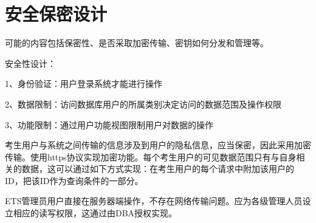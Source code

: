 \chapter{安全保密设计}
可能的内容包括保密性、是否采取加密传输、密钥如何分发和管理等。

安全性设计：

1、身份验证：用户登录系统才能进行操作

2、数据限制：访问数据库用户的所属类别决定访问的数据范围及操作权限

3、功能限制：通过用户功能视图限制用户对数据的操作

考生用户与系统之间传输的信息涉及到用户的隐私信息，应当保密，因此采用加密传输。使用https协议实现加密功能。每个考生用户的可见数据范围只有与自身相关的数据，这可以通过如下方式实现：在考生用户的每个请求中附加该用户的ID，把该ID作为查询条件的一部分。

ETS管理员用户直接在服务器端操作，不存在网络传输问题。应为各级管理人员设立相应的读写权限，这通过由DBA授权实现。